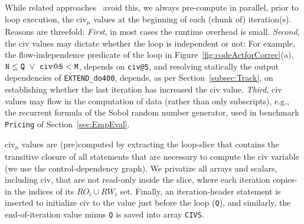 \documentclass[10pt,nocopyrightspace]{sigplanconf}
\begin{document}
While related approaches~\cite{PaduaDemDrInterproc,VEG} avoid this, we always pre-compute in
parallel, prior to loop execution, the {\sc civ}$_\mu$ values at the beginning 
of each (chunk of) iteration(s).
Reasons are threefold: {\em First}, in most cases 
the runtime overhead is small. {\em Second}, the {\sc civ} values may dictate
whether the loop is independent or not: For example,  the flow-independence
predicate of the loop in Figure~\ref{fig:codeActforCorrec}(a), 
${\tt N} \le {\tt Q}~\vee~{\tt civ@5} < {\tt M}$,
depends on {\tt civ@5}, and resolving statically the output 
dependencies of {\tt EXTEND\_do400}, depends, as
per Section~\ref{subsec:Track}, on establishing whether the last
iteration has increased the {\sc civ} value. 
%
{\em Third}, {\sc civ} values may flow in the computation
of data (rather than only subscripts), e.g., the recurrent
formula of the Sobol random number generator, used in
benchmark {\tt Pricing}  of Section~\ref{sec:EmpEval}.

{\sc civ}$_\mu$ values are (pre)computed by extracting the loop-slice
that contains the transitive closure of all statements 
that are necessary to compute the {\sc civ} variable
(we use the control-dependency graph). 
We privatize all arrays and scalars, including {\sc civ}, that are not 
read-only inside the slice, where each iteration copies-in the  indices 
of its $RO_i \cup RW_i$ set. Finally, an iteration-header statement is 
inserted to initialize {\sc civ} to the value just before the loop ({\tt Q}), 
and similarly, the end-of-iteration value minus {\tt Q} is saved into array 
{\tt CIVS}.  
\end{document}
